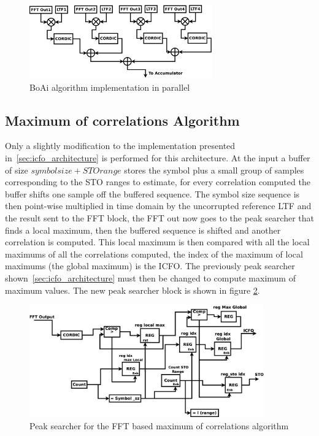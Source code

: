 \begin{figure}[!hbt]
  \centering
    \includegraphics[width=0.7\textwidth]
      {./figures/boai_parallel}
  \caption{BoAi algorithm implementation in parallel}
  \label{fig:arq_boai_parallel}
\end{figure}




\subsection{Maximum of correlations Algorithm}

Only a slightly modification to the implementation presented in~\ref{sec:icfo_architecture} is performed for this architecture. At the input a buffer of size $symbol size + STO range$ stores the symbol plus a small group of samples corresponding to the STO ranges to estimate, for every correlation computed the buffer shifts one sample off the buffered sequence. The symbol size sequence is then point-wise multiplied in time domain by the uncorrupted reference LTF and the result sent to the FFT block, the FFT out now goes to the peak searcher that finds a local maximum, then the buffered sequence is shifted and another correlation is computed. This local maximum is then compared with all the local maximums of all the correlations computed, the index of the maximum of local maximums (the global maximum) is the ICFO. The previously peak searcher shown~\ref{sec:icfo_architecture} must then be  changed to compute maximum of maximum values. The new peak searcher block is shown in figure \ref{fig:max_corre_peaks}.  

\begin{figure}[!hbt]
  \centering
    \includegraphics[width=0.9\textwidth]
      {./figures/peak_searcher_new}
  \caption{Peak searcher for the FFT based maximum of correlations algorithm}
  \label{fig:max_corre_peaks}
\end{figure}

